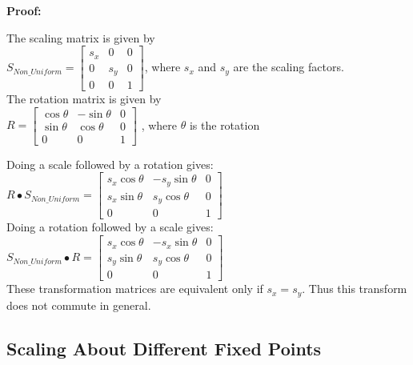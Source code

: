 \documentclass[a4paper,10pt]{scrartcl}
\begin{document}
{\bfseries Proof:}

The scaling matrix is given by \\

$S_{Non\_Uniform} = \begin{bmatrix}
    s_x       & 0 & 0 \\
    0       & s_y & 0 \\
    0       & 0 & 1     
 \end{bmatrix}
$, where $s_x$ and $s_y$ are the scaling factors. \\

The rotation matrix is given by \\

$R = \begin{bmatrix}
      \cos{\theta}       & -\sin{\theta} & 0 \\
      \sin{\theta}       & \cos{\theta} & 0 \\
      0       & 0 & 1             
     \end{bmatrix}
$   , where $\theta$ is the rotation

Doing a scale followed by a rotation gives: \\

$R \bullet S_{Non\_Uniform} = \begin{bmatrix}
		  s_x\cos{\theta} & -s_y\sin{\theta} & 0 \\
		  s_x\sin{\theta} & s_y\cos{\theta} & 0 \\
		  0 & 0 & 1
               \end{bmatrix}
$ \\


Doing a rotation followed by a scale gives: \\

$S_{Non\_Uniform} \bullet R = \begin{bmatrix}
		  s_x\cos{\theta} & -s_x\sin{\theta} & 0 \\
		  s_y\sin{\theta} & s_y\cos{\theta} & 0 \\
		  0 & 0 & 1
               \end{bmatrix}
$ \\

These transformation matrices are equivalent only if $s_x = s_y$. Thus this transform does not commute in general.

\subsection{Scaling About Different Fixed Points}
\end{document}

